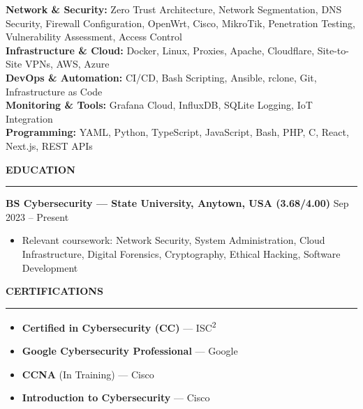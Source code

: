 \documentclass[10.5pt,a4paper]{article}
\begin{document}
\vspace{5pt}
{\small
\textbf{Network \& Security:} Zero Trust Architecture, Network Segmentation, DNS Security, Firewall Configuration, OpenWrt, Cisco, MikroTik, Penetration Testing, Vulnerability Assessment, Access Control \\[2pt]
\textbf{Infrastructure \& Cloud:} Docker, Linux, Proxies, Apache, Cloudflare, Site-to-Site VPNs, AWS, Azure \\[2pt]
\textbf{DevOps \& Automation:} CI/CD, Bash Scripting, Ansible, rclone, Git, Infrastructure as Code \\[2pt]
\textbf{Monitoring \& Tools:} Grafana Cloud, InfluxDB, SQLite Logging, IoT Integration \\[2pt]
\textbf{Programming:} YAML, Python, TypeScript, JavaScript, Bash, PHP, C, React, Next.js, REST APIs
}

\vspace{10pt}

\noindent\textbf{\large EDUCATION}\\[-6pt]
\noindent\rule{\textwidth}{0.5pt}

\vspace{5pt}
\noindent\textbf{BS Cybersecurity — State University, Anytown, USA (3.68/4.00)} \hfill {\small Sep 2023 -- Present}
\begin{itemize}\small
  \item Relevant coursework: Network Security, System Administration, Cloud Infrastructure, Digital Forensics, Cryptography, Ethical Hacking, Software Development
\end{itemize}

\vspace{10pt}

\noindent\textbf{\large CERTIFICATIONS}\\[-6pt]
\noindent\rule{\textwidth}{0.5pt}

\vspace{5pt}
\begin{itemize}\small
  \item \textbf{Certified in Cybersecurity (CC)} — ISC\textsuperscript{2}
  \item \textbf{Google Cybersecurity Professional} — Google
  \item \textbf{CCNA} (In Training) — Cisco
  \item \textbf{Introduction to Cybersecurity} — Cisco
\end{itemize}
\end{document}

